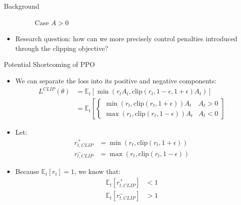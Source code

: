 \documentclass{beamer}
\begin{document}
\begin{frame}{Background}
\begin{itemize}
\begin{center}
\begin{figure}[H]
                \caption{Case $A > 0$}
            \end{figure}
        \end{center}
        \framebreak
        \item Research question: how can we more precisely control penalties 
            introduced through the clipping objective?
    \end{itemize}
\end{frame}

\begin{frame}{Potential Shortcoming of PPO}
    \begin{itemize}
        \item We can separate the loss into its positive and negative
            components:
        \begin{align*}
            L^{CLIP}(\theta) &= \mathbb{E}_t\left[ 
            \min\left(r_tA_t, \text{clip}
            (r_t, 1 - \epsilon, 1 + \epsilon)A_t\right)\right]\\
            &= \mathbb{E}_t\left[ 
            \begin{cases}
                \min\left(r_t, \text{clip}
                (r_t, 1 + \epsilon)\right)A_t & A_t > 0\\
                \max\left(r_t, \text{clip}
                (r_t, 1 - \epsilon)\right)A_t & A_t < 0
            \end{cases}\right]
        \end{align*}
        \item Let:
        \begin{align*}
            r_{t, CLIP}^+ &= 
            \min\left(r_t, \text{clip}
            (r_t, 1 + \epsilon)\right)\\
            r_{t, CLIP}^- &= 
            \max\left(r_t, \text{clip}
            (r_t, 1 - \epsilon)\right)
        \end{align*}
        \item Because $\mathbb{E}_t[r_t] = 1$, we know that:
        \begin{align*}
            \mathbb{E}_t[r_{t, CLIP}^+] &< 1\\
            \mathbb{E}_t[r_{t, CLIP}^-] &> 1\\
        \end{align*}\\


\end{itemize}
\end{frame}
\end{document}
